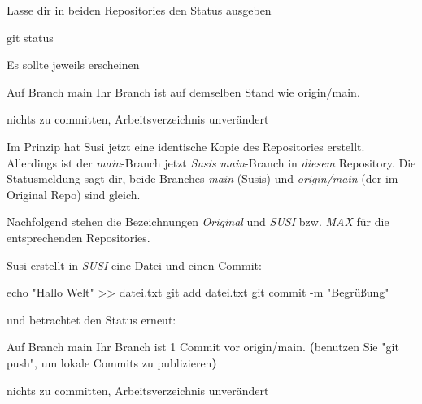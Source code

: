 \documentclass[
  letterpaper,
  DIV=11]{scrreprt}
\newenvironment{Shaded}{\begin{snugshade}}{\end{snugshade}}
\newcommand{\AttributeTok}[1]{\textcolor[rgb]{0.40,0.45,0.13}{#1}}
\newcommand{\BuiltInTok}[1]{\textcolor[rgb]{0.00,0.23,0.31}{#1}}
\newcommand{\ExtensionTok}[1]{\textcolor[rgb]{0.00,0.23,0.31}{#1}}
\newcommand{\FunctionTok}[1]{\textcolor[rgb]{0.28,0.35,0.67}{#1}}
\newcommand{\KeywordTok}[1]{\textcolor[rgb]{0.00,0.23,0.31}{\textbf{#1}}}
\newcommand{\NormalTok}[1]{\textcolor[rgb]{0.00,0.23,0.31}{#1}}
\newcommand{\OperatorTok}[1]{\textcolor[rgb]{0.37,0.37,0.37}{#1}}
\newcommand{\StringTok}[1]{\textcolor[rgb]{0.13,0.47,0.30}{#1}}
\newcommand{\branch}[1]{\textit{#1}\xspace}
\begin{document}
Lasse dir in beiden Repositories den Status ausgeben

\begin{Shaded}
\begin{Highlighting}[]
\FunctionTok{git}\NormalTok{ status}
\end{Highlighting}
\end{Shaded}

Es sollte jeweils erscheinen

\begin{Shaded}
\begin{Highlighting}[]
\ExtensionTok{Auf}\NormalTok{ Branch main}
\ExtensionTok{Ihr}\NormalTok{ Branch ist auf demselben Stand wie }\StringTok{\textquotesingle{}origin/main\textquotesingle{}}\NormalTok{.}

\ExtensionTok{nichts}\NormalTok{ zu committen, Arbeitsverzeichnis unverändert}
\end{Highlighting}
\end{Shaded}

Im Prinzip hat Susi jetzt eine identische Kopie des Repositories
erstellt. Allerdings ist der \branch{main}-Branch jetzt \emph{Susis}
\branch{main}-Branch in \emph{diesem} Repository. Die Statusmeldung sagt
dir, beide Branches \emph{main} (Susis) und \emph{origin/main} (der im
Original Repo) sind gleich.

Nachfolgend stehen die Bezeichnungen \emph{Original} und \emph{SUSI}
bzw. \emph{MAX} für die entsprechenden Repositories.

Susi erstellt in \emph{SUSI} eine Datei und einen Commit:

\begin{Shaded}
\begin{Highlighting}[]
\BuiltInTok{echo} \StringTok{"Hallo Welt"} \OperatorTok{\textgreater{}\textgreater{}}\NormalTok{ datei.txt }
\FunctionTok{git}\NormalTok{ add datei.txt }
\FunctionTok{git}\NormalTok{ commit }\AttributeTok{{-}m} \StringTok{"Begrüßung"}
\end{Highlighting}
\end{Shaded}

und betrachtet den Status erneut:

\begin{Shaded}
\begin{Highlighting}[]
\ExtensionTok{Auf}\NormalTok{ Branch main}
\ExtensionTok{Ihr}\NormalTok{ Branch ist 1 Commit vor }\StringTok{\textquotesingle{}origin/main\textquotesingle{}}\NormalTok{.}
  \KeywordTok{(}\ExtensionTok{benutzen}\NormalTok{ Sie }\StringTok{"git push"}\NormalTok{, um lokale Commits zu publizieren}\KeywordTok{)}

\ExtensionTok{nichts}\NormalTok{ zu committen, Arbeitsverzeichnis unverändert}
\end{Highlighting}
\end{Shaded}
\end{document}
